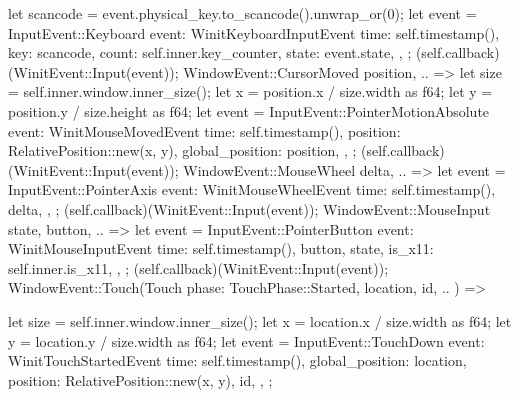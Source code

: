 {{{{                let scancode = event.physical_key.to_scancode().unwrap_or(0);
                let event = InputEvent::Keyboard {
                    event: WinitKeyboardInputEvent {
                        time: self.timestamp(),
                        key: scancode,
                        count: self.inner.key_counter,
                        state: event.state,
                    },
                };
                (self.callback)(WinitEvent::Input(event));
            }
            WindowEvent::CursorMoved { position, .. } => {
                let size = self.inner.window.inner_size();
                let x = position.x / size.width as f64;
                let y = position.y / size.height as f64;
                let event = InputEvent::PointerMotionAbsolute {
                    event: WinitMouseMovedEvent {
                        time: self.timestamp(),
                        position: RelativePosition::new(x, y),
                        global_position: position,
                    },
                };
                (self.callback)(WinitEvent::Input(event));
            }
            WindowEvent::MouseWheel { delta, .. } => {
                let event = InputEvent::PointerAxis {
                    event: WinitMouseWheelEvent {
                        time: self.timestamp(),
                        delta,
                    },
                };
                (self.callback)(WinitEvent::Input(event));
            }
            WindowEvent::MouseInput { state, button, .. } => {
                let event = InputEvent::PointerButton {
                    event: WinitMouseInputEvent {
                        time: self.timestamp(),
                        button,
                        state,
                        is_x11: self.inner.is_x11,
                    },
                };
                (self.callback)(WinitEvent::Input(event));
            }
            WindowEvent::Touch(Touch {
                phase: TouchPhase::Started,
                location,
                id,
                ..
            }) => {
                let size = self.inner.window.inner_size();
                let x = location.x / size.width as f64;
                let y = location.y / size.width as f64;
                let event = InputEvent::TouchDown {
                    event: WinitTouchStartedEvent {
                        time: self.timestamp(),
                        global_position: location,
                        position: RelativePosition::new(x, y),
                        id,
                    },
                };

}}}}

